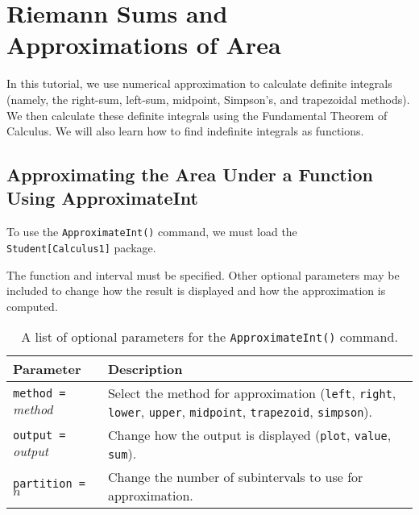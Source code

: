 \chapter{Riemann Sums and Approximations of Area}
\label{chp:riemann_sums_and_area_approximation}	

In this tutorial, we use numerical approximation to calculate definite integrals (namely, the right-sum, left-sum, midpoint, Simpson's, and trapezoidal methods). We then calculate these definite integrals using the Fundamental Theorem of Calculus. We will also learn how to find indefinite integrals as functions.

\section{Approximating the Area Under a Function Using ApproximateInt}
\label{sec:approximating_area_using_approximateint}

To use the \texttt{ApproximateInt()} command, we must load the \\
\noindent\texttt{Student[Calculus1]} package.

The function and interval must be specified. Other optional parameters may be included to change how the result is displayed and how the approximation is computed.


\begin{table}
\label{tbl:approximateint_options}
\centering
\begin{tabular}{lp{2.5in}}
\hline
Parameter & Description\\
\hline
\texttt{method = }\textit{method}	& Select the method for approximation (\texttt{left}, \texttt{right}, \texttt{lower}, 
									\texttt{upper}, \texttt{midpoint}, \texttt{trapezoid}, \texttt{simpson}).\\
\texttt{output = }\textit{output}	& Change how the output is displayed (\texttt{plot}, \texttt{value}, \texttt{sum}).\\
\texttt{partition = $n$}			& Change the number of subintervals to use for approximation.\\
\hline
\end{tabular}
\caption{A list of optional parameters for the \texttt{ApproximateInt()} command.}
\end{table}

